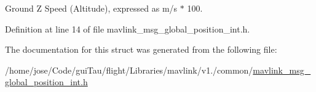 Ground Z Speed (Altitude), expressed as m/s $\ast$ 100. 



Definition at line 14 of file mavlink\-\_\-msg\-\_\-global\-\_\-position\-\_\-int.\-h.



The documentation for this struct was generated from the following file\-:\begin{DoxyCompactItemize}
\item 
/home/jose/\-Code/gui\-Tau/flight/\-Libraries/mavlink/v1./common/\hyperlink{mavlink__msg__global__position__int_8h}{mavlink\-\_\-msg\-\_\-global\-\_\-position\-\_\-int.\-h}\end{DoxyCompactItemize}
